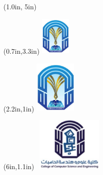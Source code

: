 \newcommand{\titlefont}{\fontfamily{ptm}\fontsize{18}{22}\selectfont\bfseries}

\begin{titlepage}
    

   \begin{textblock*}{1cm}(1.0in, 5in)  %
   	\centering
   \end{textblock*}
   
    \vspace*{1.2in}
    \centering
    
    \begin{textblock*}{1.04in}(0.7in,3.3in)
    \includegraphics[width=0.576in,height=0.7488in]{assets/uni.png}
    \end{textblock*}
    
    \begin{textblock*}{1.04in}(2.2in,1in)
    \includegraphics[width=0.8in,height=1.04in]{assets/uni.png}
    \end{textblock*}

    \begin{textblock*}{1.04in}(6in,1.1in)
    \includegraphics[width=1.4in,height=1.04in]{assets/dep.png}
    \end{textblock*}


\end{titlepage}
